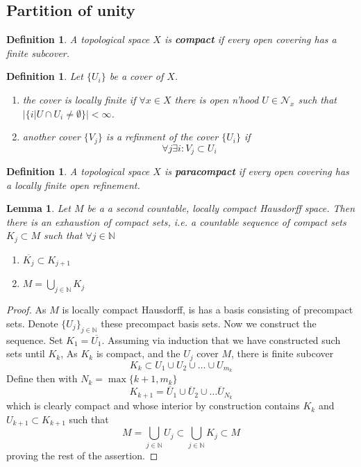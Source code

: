 \documentclass{article}
\numberwithin{theorem}{section}
\newtheorem{lemma}[theorem]{Lemma}
\newtheorem{definition}[theorem]{Definition}
\newcommand{\N}{\mathbb{N}}
\newcommand{\1}{\mathds{1}}
\begin{document}
\subsection{Partition of unity}
\begin{definition}
    A topological space $X$ is \textbf{compact} if every open covering has a finite subcover. 
\end{definition}

\begin{definition}
    Let $\{ U_i \}$ be a cover of $X$. 
    \begin{enumerate}
        \item the cover is locally finite if $\forall x \in X$ there is open n'hood $U\in \mathcal{N}_x$ such that $|\{ i | U\cap U_i \neq \emptyset \} | < \infty $. 
        \item another cover  $\{ V_j \}$ is a refinment of the cover $\{ U_i \}$  if \[ \forall j \exists i : V_j \subset U_i \] 
    \end{enumerate}
\end{definition}

\begin{definition}
    A topological space $X$ is \textbf{paracompact} if every open covering has a locally finite open refinement. 
\end{definition}


\begin{lemma}
    Let $M$ be a a second countable, locally compact Hausdorff space.  Then there is an exhaustion of compact sets, i.e. a countable sequence of compact sets $K_j \subset M $ such that $\forall j \in \N$ 
    \begin{enumerate}
        \item $\overline{K_j} \subset K_{j+1}$
        \item $ M = \bigcup_{j \in \N} K_j $ 
    \end{enumerate}
\end{lemma}

\begin{proof}
    As $M$ is locally compact Hausdorff, is has a basis consisting of precompact sets. Denote $\{ U_j\}_{j \in \N}$ these precompact basis sets. Now we construct the sequence. Set $K_1 = \overline{U_1}$. Assuming via induction that we have constructed such sets until $K_k$, 
    As $K_k$ is compact, and the $U_j$ cover $M$, there is finite subcover 
    \[ K_k \subset U_{1} \cup U_2 \cup \dots \cup U_{m_k}\]
    Define then with $N_k = \max \{k+1, m_k\}$ 
    \[ K_{k+1} = \overline{U}_1  \cup  \overline{U}_2 \cup \dots \overline{U}_{N_k}\]
    which is clearly compact and whose interior by construction contains $K_k$ and $U_{k+1} \subset K_{k+1}$ such that 
    \[ M = \bigcup_{j \in \N} U_j \subset \bigcup_{j \in \N } K_j \subset M \]
    proving the rest of the assertion. 
\end{proof}
\end{document}
